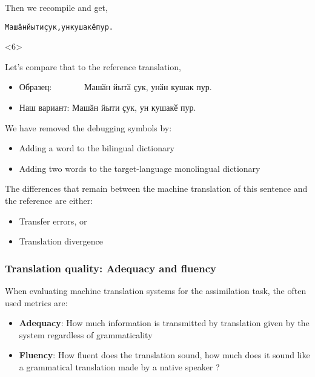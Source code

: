 \documentclass[10pt,xetex]{beamer} %
\begin{document}
\begin{frame}[fragile]
\begin{onlyenv}
\begin{verbatim}
\end{verbatim}

Then we recompile and get,

\begin{alltt}
{\smallermono Машӑн йыти ҫук, ун кушакӗ пур. }
\end{alltt}

\end{onlyenv}

\begin{onlyenv}<6>

Let's compare that to the reference translation,

\begin{itemize}
  \item Образец: ~~~~~~~Машӑн йытӑ ҫук, унӑн кушак пур.
  \item Наш вариант: Машӑн \alert{йыти} ҫук, \alert{ун} \alert{кушакӗ} пур.
\end{itemize}

We have removed the debugging symbols by:

\begin{itemize}

  \item Adding a word to the bilingual dictionary
  \item Adding two words to the target-language monolingual dictionary
\end{itemize}

The differences that remain between the machine translation of this sentence 
and the reference are either:

\begin{itemize}

  \item Transfer errors, or
  \item Translation divergence 
\end{itemize}

\end{onlyenv}

\end{frame}



\begin{frame}
  \frametitle{Translation quality: Adequacy and fluency}

When evaluating machine translation systems for the assimilation task, the often used 
metrics are:

\begin{itemize}
  \item {\bf Adequacy}: How much information is transmitted by translation given by the system
   regardless of grammaticality
  \item {\bf Fluency}: How fluent does the translation sound, how much does it sound like 
   a grammatical translation made by a native speaker ?
\end{itemize}

\end{frame}
\end{document}
